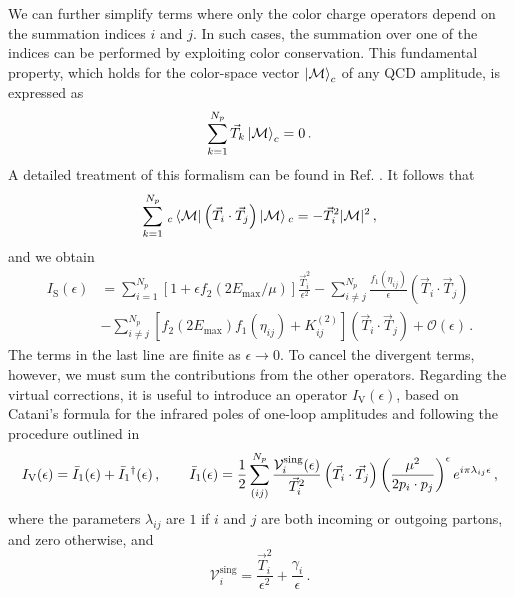 \documentclass[a4paper, 12pt]{book}
\begin{document}
We can further simplify terms where only the color charge operators depend on the summation indices $i$ and $j$. In such cases, the summation over one of the indices can be performed by exploiting color conservation. This fundamental property, which holds for the color-space vector $\ket{\mathcal{M}}_c$ of any QCD amplitude, is expressed as
\begin{equation}
  \sum_{k=1}^{N_p} \vec{T}_k  \ket{\mathcal{M}}_c = 0 \, .
\end{equation}
A detailed treatment of this formalism can be found in Ref. \cite{Catani:1996vz}. It follows that 
\begin{equation}
  \sum_{k=1}^{N_p} \, {}_c \bra{\mathcal{M}} \left( \vec{T}_i \cdot \vec{T}_j\right) \ket{\mathcal{M}} {}_c= - \vec{T}^2_i |\mathcal{M}|^2 \, ,
  \label{color-conservation}
\end{equation}
and we obtain
\begin{equation}
  \begin{aligned}
  I_{\mathrm{S}}(\epsilon)  &= \sum_{i=1}^{N_p}  \left[1+\epsilon f_2(2E_{\mathrm{max}}/\mu)\right] \frac{\vec{T}_i^2}{\epsilon^2}- \sum_{i\neq j}^{N_p} \frac{f_1(\eta_{ij})}{\epsilon} \left( \vec{T}_i \cdot \vec{T}_j\right) \\
 & - \sum_{i\neq j}^{N_p} \left[ f_2 \left(2 E_{\mathrm{max}}\right) f_1(\eta_{ij}) + K_{ij}^{(2)}\right] (\vec{T}_i \cdot \vec{T}_j) + \mathcal{O}(\epsilon) \,.
  \end{aligned}
\end{equation}
The terms in the last line are finite as $\epsilon \to 0$. To cancel the divergent terms, however, we must sum the contributions from the other operators. Regarding the virtual corrections, it is useful to introduce an operator $I_{\mathrm{V}}(\epsilon)$, based on Catani's formula for the infrared poles of one-loop amplitudes \cite{Catani:1998bh} and following the procedure outlined in \cite{Devoto:2023rpv}
\begin{equation}
  I_{\mathrm{V}}(\epsilon) = \bar{I}_1 (\epsilon) + \bar{I}_1\textsuperscript{\textdagger} (\epsilon) \,, \qquad \bar{I}_1 (\epsilon)= \frac{1}{2} \sum_{(ij)}^{N_p} \frac{\mathcal{V}_i^{\mathrm{sing}}(\epsilon)}{\vec{T}_i^2} \left( \vec{T}_i \cdot \vec{T}_j\right) \left(\frac{\mu^2}{2p_i \cdot p_j}\right)^{\epsilon} e^{i \pi \lambda_{ij} \epsilon} \, ,
\end{equation}
where the parameters $\lambda_{ij}$ are $1$ if $i$ and $j$ are both incoming or outgoing partons, and zero otherwise, and 
\begin{equation}
  \mathcal{V}_i^{\mathrm{sing}}= \frac{\vec{T}_i^2}{\epsilon^2} + \frac{\gamma_i}{\epsilon} \,. 
\end{equation}
\end{document}
